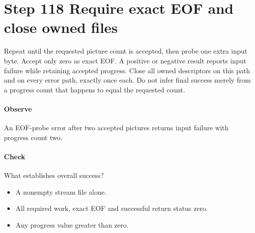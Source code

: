 \section{Step 118 Require exact EOF and close owned files}\label{h263-clip-s08}
Repeat until the requested picture count is accepted, then probe one extra input
byte. Accept only zero as exact EOF. A positive or negative result reports input
failure while retaining accepted progress. Close all owned descriptors on this
path and on every error path, exactly once each. Do not infer final success merely
from a progress count that happens to equal the requested count.

\paragraph{Observe} An EOF-probe error after two accepted pictures returns input failure with progress count two.
\paragraph{Check} What establishes overall success?
\begin{itemize}
  \item[A.] A nonempty stream file alone.
  \item[B.] All required work, exact EOF and successful return status zero.
  \item[C.] Any progress value greater than zero.
\end{itemize}
